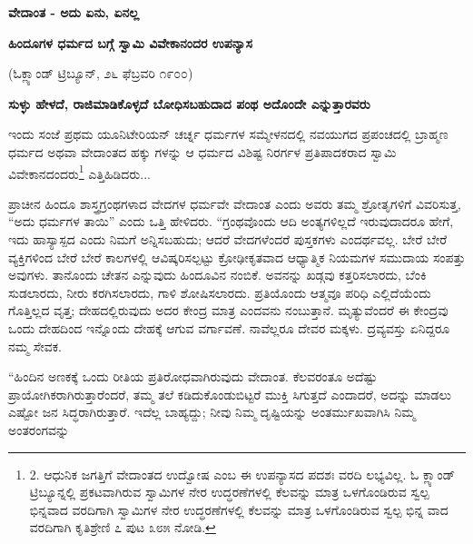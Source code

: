\begin{center}
\textbf{ವೇದಾಂತ - ಅದು ಏನು, ಏನಲ್ಲ}
\end{center}

\begin{center}
\textbf{ಹಿಂದೂಗಳ ಧರ್ಮದ ಬಗ್ಗೆ ಸ್ವಾಮಿ ವಿವೇಕಾನಂದರ ಉಪನ್ಯಾಸ}
\end{center}

\begin{center}
(ಓಕ್ಲ್ಯಾಂಡ್ ಟ್ರಿಬ್ಯೂನ್, ೨೬ ಫೆಬ್ರವರಿ ೧೯೦೦)
\end{center}

\begin{center}
\textbf{ಸುಳ್ಳು ಹೇಳದೆ, ರಾಜಿಮಾಡಿಕೊಳ್ಳದೆ ಬೋಧಿಸಬಹುದಾದ ಪಂಥ ಅದೊಂದೇ ಎನ್ನುತ್ತಾರವರು}
\end{center}

ಇಂದು ಸಂಜೆ ಪ್ರಥಮ ಯೂನಿಟೇರಿಯನ್ ಚರ್ಚ್ನ ಧರ್ಮಗಳ ಸಮ್ಮೇಳನದಲ್ಲಿ ನವಯುಗದ ಪ್ರಪಂಚದಲ್ಲಿ ಬ್ರಾಹ್ಮಣ ಧರ್ಮದ ಅಥವಾ ವೇದಾಂತದ ಹಕ್ಕು ಗಳನ್ನು ಆ ಧರ್ಮದ ವಿಶಿಷ್ಟ ನಿರರ್ಗಳ ಪ್ರತಿಪಾದಕರಾದ ಸ್ವಾಮಿ ವಿವೇಕಾನದಂದರು\footnote{2. ಆಧುನಿಕ ಜಗತ್ತಿಗೆ ವೇದಾಂತದ ಉದ್ವೋಷ ಎಂಬ ಈ ಉಪನ್ಯಾಸದ ಪದಶಃ ವರದಿ ಲಭ್ಯವಿಲ್ಲ. ಓ ಕ್ಲ್ಯಾಂಡ್ ಟ್ರಿಬ್ಯೂನ್ನಲ್ಲಿ ಪ್ರಕಟವಾಗಿರುವ ಸ್ವಾಮಿಗಳ ನೇರ ಉದ್ಧರಣೆಗಳಲ್ಲಿ ಕೆಲವನ್ನು ಮಾತ್ರ ಒಳಗೊಂಡಿರುವ ಸ್ವಲ್ಪ ಭಿನ್ನವಾದ ವರದಿಗಾಗಿ ಸ್ವಾಮಿಗಳ ನೇರ ಉದ್ಧರಣೆಗಳಲ್ಲಿ ಕೆಲವನ್ನು ಮಾತ್ರ ಒಳಗೊಂಡಿರುವ ಸ್ವಲ್ಪ ಭಿನ್ನ ವಾದ ವರದಿಗಾಗಿ ಕೃತಿಶ್ರೇಣಿ ೭ ಪುಟ ೩೮೫ ನೋಡಿ.} ಎತ್ತಿಹಿಡಿದರು...

ಪ್ರಾಚೀನ ಹಿಂದೂ ಶಾಸ್ತ್ರಗ್ರಂಥಗಳಾದ ವೇದಗಳ ಧರ್ಮವೇ ವೇದಾಂತ ಎಂದು ಅವರು ತಮ್ಮ ಶ್ರೋತೃಗಳಿಗೆ ವಿವರಿಸುತ್ತ, “ಅದು ಧರ್ಮಗಳ ತಾಯಿ” ಎಂದು ಒತ್ತಿ ಹೇಳಿದರು. “ಗ್ರಂಥವೊಂದು ಆದಿ ಅಂತ್ಯಗಳಿಲ್ಲದೆ ಇರುವುದಾದರೂ ಹೇಗೆ, ಇದು ಹಾಸ್ಯಾಸ್ಪದ ಎಂದು ನಿಮಗೆ ಅನ್ನಿಸಬಹುದು; ಆದರೆ ವೇದಗಳೆಂದರೆ ಪುಸ್ತಕಗಳು ಎಂದರ್ಥವಲ್ಲ. ಬೇರೆ ಬೇರೆ ವ್ಯಕ್ತಿಗಳಿಂದ ಬೇರೆ ಬೇರೆ ಕಾಲಗಳಲ್ಲಿ ಆವಿಷ್ಕರಿಸಲ್ಪಟ್ಟು ಕ್ರೋಢೀಕೃತವಾದ ಆಧ್ಯಾತ್ಮಿಕ ನಿಯಮಗಳ ಸಮುದಾಯ ಸಂಪತ್ತು ಅವುಗಳು. ತಾನೊಂದು ಚೇತನ ಎನ್ನುವುದು ಹಿಂದೂವಿನ ನಂಬಿಕೆ. ಅವನನ್ನು ಖಡ್ಗವು ಕತ್ತರಿಸಲಾರದು, ಬೆಂಕಿ ಸುಡಲಾರದು, ನೀರು ಕರಗಿಸಲಾರದು, ಗಾಳಿ ಶೋಷಿಸಲಾರದು. ಪ್ರತಿಯೊಂದು ಆತ್ಮವೂ ಪರಿಧಿ ಎಲ್ಲಿದೆಯೆಂದು ಗೊತ್ತಿಲ್ಲದ ವೃತ್ತ; ದೇಹದಲ್ಲಿರುವುದು ಅದರ ಕೇಂದ್ರ ಮಾತ್ರ ಎಂದವನು ನಂಬುತ್ತಾನೆ. ಮೃತ್ಯುವೆಂದರೆ ಈ ಕೇಂದ್ರವು ಒಂದು ದೇಹದಿಂದ ಇನ್ನೊಂದು ದೇಹಕ್ಕೆ ಆಗುವ ವರ್ಗಾವಣೆ. ನಾವೆಲ್ಲರೂ ದೇವರ ಮಕ್ಕಳು. ದ್ರವ್ಯವಸ್ತು ಏನಿದ್ದರೂ ನಮ್ಮ ಸೇವಕ.

“ಹಿಂದಿನ ಅಣಕಕ್ಕೆ ಒಂದು ರೀತಿಯ ಪ್ರತಿರೋಧವಾಗಿರುವುದು ವೇದಾಂತ. ಕೆಲವರಂತೂ ಅದೆಷ್ಟು ಪ್ರಾಯೋಗಿಕರಾಗಿರುತ್ತಾರೆಂದರೆ, ತಮ್ಮ ತಲೆ ಕಡಿದುಕೊಂಡುಬಿಟ್ಟರೆ ಮುಕ್ತಿ ಸಿಗುತ್ತದೆ ಎಂದಾದರೆ, ಅದನ್ನು ಮಾಡಲು ಎಷ್ಟೋ ಜನ ಸಿದ್ಧರಾಗಿರುತ್ತಾರೆ. ಇದೆಲ್ಲ ಬಾಹ್ಯದ್ದು; ನೀವು ನಿಮ್ಮ ದೃಷ್ಟಿಯನ್ನು ಅಂತರ್ಮುಖವಾಗಿಸಿ ನಿಮ್ಮ ಅಂತರಂಗವನ್ನು


